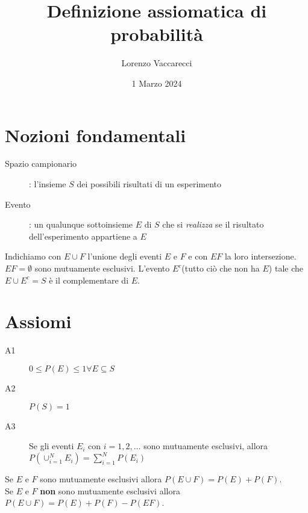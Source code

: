 \documentclass[12pt]{article}
\title{Definizione assiomatica di probabilità}
\author{Lorenzo Vaccarecci}
\date{1 Marzo 2024}
\begin{document}
\maketitle
\section{Nozioni fondamentali}
\begin{description}
    \item[Spazio campionario]: l'insieme \(S\) dei possibili risultati di un esperimento
    \item[Evento]: un qualunque sottoinsieme \(E\) di \(S\) che si \textit{realizza} se il risultato dell'esperimento appartiene a \(E\)  
\end{description}
Indichiamo con \(E \cup F\) l'unione degli eventi \(E\) e \(F\) e con \(EF\) la loro intersezione. \(EF=\emptyset\) sono mutuamente esclusivi. L'evento \(E^{c}\)(tutto ciò che non ha \(E\)) tale che \(E\cup E^{c}=S\) è il complementare di \(E\). 
\section{Assiomi}
\begin{description}
    \item[A1] \(0\leq P(E) \leq 1 \forall E \subseteq S\)
    \item[A2] \(P(S)=1\)
    \item[A3] Se gli eventi \(E_{i}\) con \(i=1,2,\dots\) sono mutuamente esclusivi, allora \(P(\cup_{i=1}^N E_{i})=\sum_{i = 1}^{N} P(E_{i})\)   
\end{description}
Se \(E \text{ e } F\) sono mutuamente esclusivi allora \(P(E \cup F)=P(E)+P(F)\).\\Se \(E \text{ e } F\) \textbf{non} sono mutuamente esclusivi allora \(P(E \cup F)=P(E)+P(F)-P(EF)\).
\end{document}
